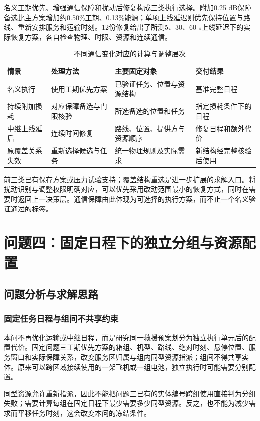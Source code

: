 \documentclass[withoutpreface,colorprint]{format}
\numberwithin{equation}{section}
\numberwithin{figure}{section}
\numberwithin{table}{section}
\begin{document}
名义工期优先、增强通信保障和扰动后修复构成三类执行选择。附加0.25 dB保障备选比主方案增加约0.50\%工期、0.13\%能源；单项上线延迟则优先保持位置与路线、重新安排服务和运输时刻。12份修复给出了所测5、30、60 s上线延迟下的实际恢复方案，各自检查物理、时限、资源和连续通信。

\begin{table}[htbp]\centering\small
\caption{不同通信变化对应的计算与调整层次}\label{tab:q3_recovery_policy}
\begin{tabularx}{\linewidth}{p{2.3cm}LLL}\toprule
情景 & 处理方法 & 主要固定对象 & 交付结果\\\midrule
名义执行 & 使用工期优先方案 & 已验证任务、位置与资源结构 & 基准完整日程\\
持续附加损耗 & 对应保障备选与门限核验 & 所选备选的位置和任务 & 指定损耗条件下的日程\\
中继上线延后 & 连续时间修复 & 路线、位置、提供方与资源顺序 & 修复日程和额外代价\\
原覆盖关系失效 & 重新选择候选与任务 & 统一物理规则及实际需求 & 新结构经完整核验后使用\\\bottomrule
\end{tabularx}\end{table}

前三类已有保存方案或压力试验支持；覆盖结构重选是进一步扩展的求解入口。将扰动识别与调整权限明确对应，可以优先采用改动范围最小的恢复方式，同时在需要时返回上一决策层。通信保障由此体现为可选择的执行方案，而不止一个名义验证通过的标签。



\section{问题四：固定日程下的独立分组与资源配置}
\label{sec:q4}

\subsection{问题分析与求解思路}
\subsubsection{固定任务日程与组间不共享约束}
本问不再优化运输或中继日程，而是研究同一救援预案划分为独立执行单元后的配置代价。固定问题三工期优先方案的箱组、机型、路线、绝对时刻、悬停位置、服务窗口和实际保障关系，改变服务区归属与组内同型资源指派；组间不得共享实体。原来可以跨区域接续使用的一架飞机或一组电池，独立执行时可能需要分别配置。

同型资源允许重新指派，因此不能把问题三已有的实体编号跨组使用直接判为分组失败；需要计算每组在固定日程下最少需要多少同型资源。反之，也不能为减少需求而平移任务时刻，这会改变本问的冻结条件。
\end{document}
